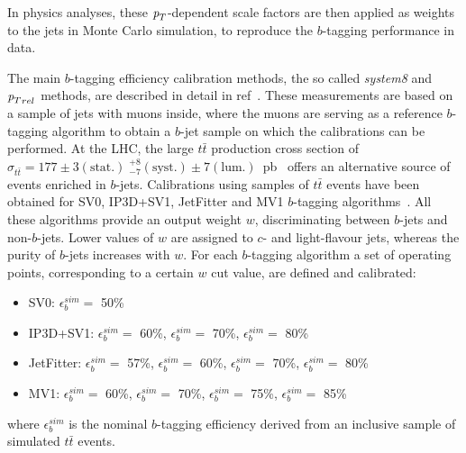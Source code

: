 In physics analyses, these ${\emph{p}_{T}}$-dependent scale factors are then applied as weights to the jets in Monte Carlo simulation, to reproduce the $b$-tagging performance in data.


The main $b$-tagging efficiency calibration methods, the so called \emph{system8} and ${\emph{p}_{T}}_{rel}$ methods, are described in detail in ref~\cite{ATLAS-CONF-2011-089}.%
These measurements are based on a sample of jets with muons inside, where the muons are serving as a reference $b$-tagging algorithm to obtain a $b$-jet sample on which the calibrations can be performed. 
At the LHC, the large $t\bar{t}$ production cross section of $\sigma_{t\bar{t}} = 177 \pm 3(\mbox{stat.})  \; _{-7}^{+8} (\mbox{syst.}) \pm 7(\mbox{lum.})$~pb~\cite{ATLAS-CONF-2012-024} offers an alternative source of events enriched in $b$-jets. %
Calibrations using samples of $t\bar{t}$ events have been obtained for SV0, IP3D+SV1, JetFitter and MV1 $b$-tagging algorithms~\cite{ATLAS-CONF-2012-097}. All these algorithms provide an output weight $w$, discriminating between $b$-jets and non-$b$-jets. Lower values of $w$ are assigned to $c$- and light-flavour jets, whereas the purity of $b$-jets increases with $w$. For each $b$-tagging algorithm a set of operating points, corresponding to a certain $w$ cut value, are defined and calibrated:

\begin{itemize}
\item
SV0: $\epsilon_b^{sim} =$ 50\%
\item
IP3D+SV1: $\epsilon_b^{sim} =$ 60\%, $\epsilon_b^{sim} =$ 70\%, $\epsilon_b^{sim} =$ 80\%
\item
JetFitter: $\epsilon_b^{sim} =$ 57\%, $\epsilon_b^{sim} =$ 60\%,  $\epsilon_b^{sim} =$ 70\%, $\epsilon_b^{sim} =$ 80\%
\item
MV1: $\epsilon_b^{sim} =$ 60\%, $\epsilon_b^{sim} =$ 70\%, $\epsilon_b^{sim} =$ 75\%, $\epsilon_b^{sim} =$ 85\%
\end{itemize}
%
where  $\epsilon_b^{sim}$ is the nominal $b$-tagging efficiency derived from an inclusive sample of simulated $t\bar{t}$ events.

